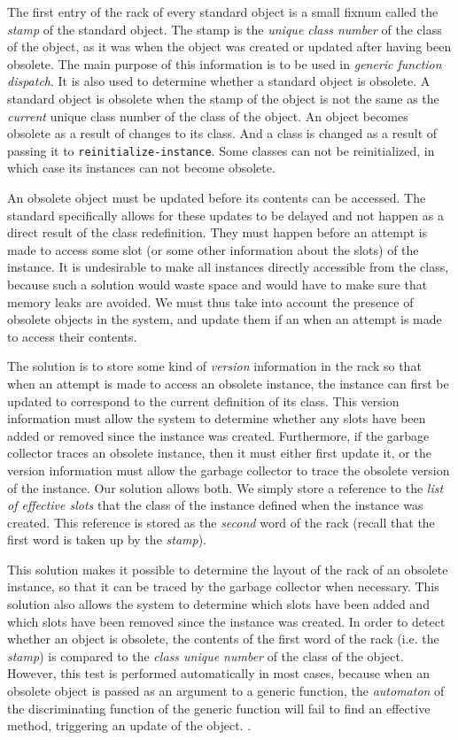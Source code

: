 The first entry of the rack of every standard object is a small fixnum
called the \emph{stamp} of the standard object.  The stamp is the
\emph{unique class number} of the class of the object, as it was when
the object was created or updated after having been obsolete.  The
main purpose of this information is to be used in \emph{generic
  function dispatch}.  It is also used to determine whether a standard
object is obsolete.  A standard object is obsolete when the stamp of
the object is not the same as the \emph{current} unique class number
of the class of the object.  An object becomes obsolete as a result
of changes to its class.  And a class is changed as a result of
passing it to \texttt{reinitialize-instance}.  Some classes can not be
reinitialized, in which case its instances can not become obsolete.

An obsolete object must be updated before its contents can be
accessed.  The standard specifically allows for these updates to be
delayed and not happen as a direct result of the class redefinition.
They must happen before an attempt is made to access some slot (or
some other information about the slots) of the instance.  It is
undesirable to make all instances directly accessible from the class,
because such a solution would waste space and would have to make sure
that memory leaks are avoided.  We must thus take into account the
presence of obsolete objects in the system, and update them if an
when an attempt is made to access their contents.

The solution is to store some kind of \emph{version} information in
the rack so that when an attempt is made to access an
obsolete instance, the instance can first be updated to correspond to
the current definition of its class.  This version information must
allow the system to determine whether any slots have been added or
removed since the instance was created.  Furthermore, if the garbage
collector traces an obsolete instance, then it must either first
update it, or the version information must allow the garbage collector
to trace the obsolete version of the instance.  Our solution allows
both.  We simply store a reference to the \emph{list of effective
  slots} that the class of the instance defined when the instance was
created.  This reference is stored as the \emph{second} word of the
rack (recall that the first word is taken up by the
\emph{stamp}).

This solution makes it possible to determine the layout of the rack of
an obsolete instance, so that it can be traced by the garbage
collector when necessary.  This solution also allows the system to
determine which slots have been added and which slots have been
removed since the instance was created.  In order to detect whether an
object is obsolete, the contents of the first word of the rack
(i.e. the \emph{stamp}) is compared to the \emph{class unique number}
of the class of the object.  However, this test is performed
automatically in most cases, because when an obsolete object is passed
as an argument to a generic function, the \emph{automaton} of the
discriminating function of the generic function will fail to find an
effective method, triggering an update of the object.
.

